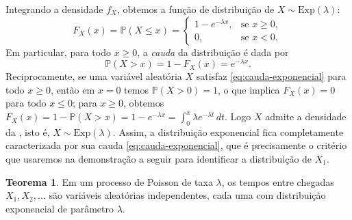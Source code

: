 \documentclass[12pt,portuguese]{article}
\theoremstyle{definition}
\newtheorem{theorem}{Teorema}
\theoremstyle{plainexercise}
\theoremstyle{starredexercise}
\theoremstyle{definition}
\begin{document}
Integrando a densidade $f_X$, obtemos a função de distribuição de
$X\sim\mathrm{Exp}(\lambda)$:
\[
  F_X(x)=\mathbb{P}(X\leqslant x)=
  \begin{cases}
    1-e^{-\lambda x}, & \text{se } x\geqslant 0,
    \\[0.2cm]
    0, & \text{se } x<0.
  \end{cases}
\]
Em particular, para todo $x\geqslant 0$, a \emph{cauda} da distribuição é dada
por
\begin{equation}\label{eq:cauda-exponencial}
  \mathbb{P}(X>x)=1-F_X(x)=e^{-\lambda x}.
\end{equation}
Reciprocamente, se uma variável aleatória $X$ satisfaz
\eqref{eq:cauda-exponencial} para todo $x\geqslant 0$, então em $x=0$ temos
$\mathbb{P}(X>0)=1$, o que implica $F_X(x)=0$ para todo $x\leqslant 0$; para
$x\geqslant 0$, obtemos
$F_X(x)=1-\mathbb{P}(X>x)=1-e^{-\lambda x}=\int_0^x \lambda e^{-\lambda t}\,dt$.
Logo $X$ admite a densidade da , isto é,
$X\sim\mathrm{Exp}(\lambda)$. Assim, a distribuição exponencial fica
completamente caracterizada por sua cauda \eqref{eq:cauda-exponencial}, que é
precisamente o critério que usaremos na demonstração a seguir para identificar
a distribuição de $X_1$.

\begin{theorem}\label{thm:exponenciais-iid}
Em um processo de Poisson de taxa $\lambda$, os tempos entre chegadas
$X_1,X_2,\ldots$ são variáveis aleatórias independentes, cada uma com
distribuição exponencial de parâmetro $\lambda$.
\end{theorem}
\end{document}
